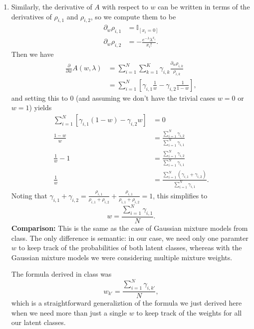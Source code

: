 \documentclass{article}
\begin{document}
\begin{enumerate}
	\item
		Similarly, the derivative of $A$ with respect to $w$ can be written in terms of the derivatives of $\rho_{i,1}$ and $\rho_{i,2}$, so we compute them to be
		\begin{align*}
			\partial_{w}{\rho_{i,1}} &= \mathbb{I}_{[x_i=0]} \\
			\partial_{w}{\rho_{i,2}} &= - \frac{e^{-\lambda}\lambda^{x_i}}{x_i!} .
		\end{align*}
		Then we have
		\begin{align*}
			\frac{\partial }{\partial w} A(w,\lambda) &= \sum_{i=1}^{N} \sum_{k=1}^{K} \gamma_{i,k} \frac{\partial_{w}{\rho_{i,k}} }{\rho_{i,k}} \\
								  &= \sum_{i=1}^{N} \left[ \gamma_{i,1}\frac{1}{w} - \gamma_{i,2}\frac{1}{1-w}  \right],
		\end{align*}
		and setting this to 0 (and assuming we don't have the trivial cases $w=0$ or $w=1$) yields
		\begin{align*}
			\sum_{i=1}^{N} \left[ \gamma_{i,1}(1-w) - \gamma_{i,2}w \right] &= 0 \\
			\frac{1-w}{w} &= \frac{\sum_{i=1}^{N} \gamma_{i,2}}{\sum_{i=1}^{N} \gamma_{i,1}} \\
			\frac{1}{w} -1 &= \frac{\sum_{i=1}^{N} \gamma_{i,2}}{\sum_{i=1}^{N} \gamma_{i,1}} \\
			\frac{1}{w} &= \frac{\sum_{i=1}^{N} (\gamma_{i,1}+\gamma_{i,2})}{\sum_{i=1}^{N} \gamma_{i,1}}.
		\end{align*}
		Noting that $\gamma_{i,1}+\gamma_{i,2}= \frac{\rho_{i,1}}{\rho_{i,1}+\rho_{i,2}} + \frac{\rho_{i,1}}{\rho_{i,1}+\rho_{i,2}} = 1$, this simplifies to
		\[
			\boxed{w = \frac{\sum_{i=1}^{N} \gamma_{i,1}}{N} .}
		\]
		\textbf{Comparison:} This is the same as the case of Gaussian mixture models from class. The only difference is semantic: in our case, we need only one paramter $w$ to keep track of the probabilities of both latent classes, whereas with the Gaussian mixture models we were considering multiple mixture weights.

		The formula derived in class was
		\[
		w_{k'} = \frac{\sum_{i=1}^{N} \gamma_{i, k'}}{N},
		\] which is a straightforward generaliztion of the formula we just derived here when we need more than just a single $w$ to keep track of the weights for all our latent classes.
\end{enumerate}
\end{document}
